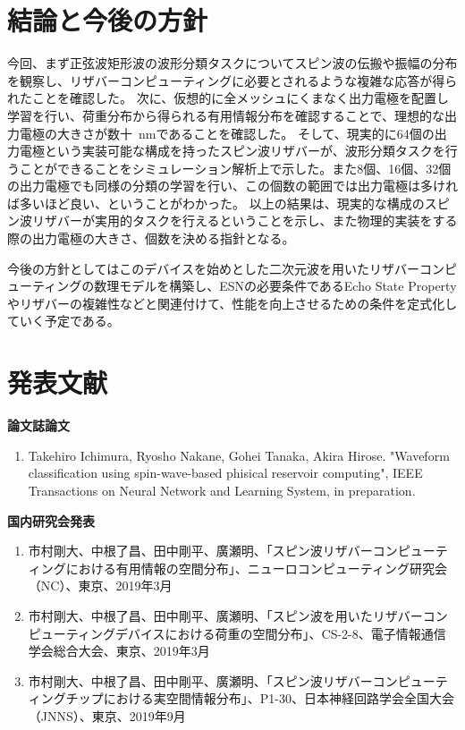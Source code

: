 \documentclass[a4j, twocolumn]{jsarticle}
\begin{document}
\section{結論と今後の方針}
\label{sec:conclusion}
今回、まず正弦波矩形波の波形分類タスクについてスピン波の伝搬や振幅の分布を観察し、リザバーコンピューティングに必要とされるような複雑な応答が得られたことを確認した。
次に、仮想的に全メッシュにくまなく出力電極を配置し学習を行い、荷重分布から得られる有用情報分布を確認することで、理想的な出力電極の大きさが数十~nmであることを確認した。
そして、現実的に64個の出力電極という実装可能な構成を持ったスピン波リザバーが、波形分類タスクを行うことができることをシミュレーション解析上で示した。また8個、16個、32個の出力電極でも同様の分類の学習を行い、この個数の範囲では出力電極は多ければ多いほど良い、ということがわかった。
以上の結果は、現実的な構成のスピン波リザバーが実用的タスクを行えるということを示し、また物理的実装をする際の出力電極の大きさ、個数を決める指針となる。

今後の方針としてはこのデバイスを始めとした二次元波を用いたリザバーコンピューティングの数理モデルを構築し、ESNの必要条件であるEcho State Propertyやリザバーの複雑性などと関連付けて、性能を向上させるための条件を定式化していく予定である。





\section*{発表文献}
{\bf 論文誌論文}
\begin{enumerate}
\item Takehiro Ichimura, Ryosho Nakane, Gohei Tanaka, Akira Hirose. "Waveform classification using spin-wave-based phisical reservoir computing", IEEE Transactions on Neural Network and Learning System, in preparation.
\end{enumerate}


{\bf 国内研究会発表}
\begin{enumerate}
\item 市村剛大、中根了昌、田中剛平、廣瀬明、「スピン波リザバーコンピューティングにおける有用情報の空間分布」、ニューロコンピューティング研究会（NC）、東京、2019年3月
\item 市村剛大、中根了昌、田中剛平、廣瀬明、「スピン波を用いたリザバーコンピューティングデバイスにおける荷重の空間分布」、CS-2-8、電子情報通信学会総合大会、東京、2019年3月
\item 市村剛大、中根了昌、田中剛平、廣瀬明、「スピン波リザバーコンピューティングチップにおける実空間情報分布」、P1-30、日本神経回路学会全国大会（JNNS）、東京、2019年9月
\end{enumerate}
\end{document}

